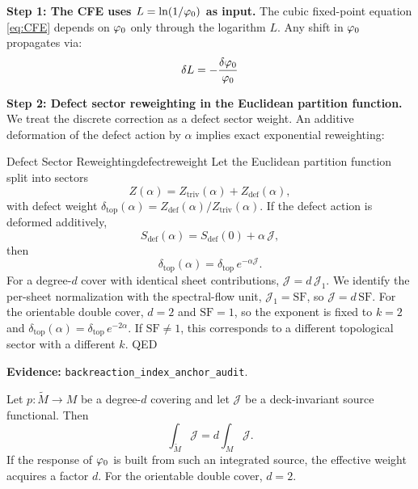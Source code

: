 \textbf{Step 1: The CFE uses $L = \ln(1/\varphi_0)$ as input.}
The cubic fixed-point equation \eqref{eq:CFE} depends on $\varphi_0$ only through 
the logarithm $L$. Any shift in $\varphi_0$ propagates via:
\begin{equation}
    \delta L = -\frac{\delta\varphi_0}{\varphi_0}
\end{equation}

\textbf{Step 2: Defect sector reweighting in the Euclidean partition function.}
We treat the discrete correction as a defect sector weight. An additive deformation of the
defect action by $\alpha$ implies exact exponential reweighting:
\begin{lemma}{Defect Sector Reweighting}{defectreweight}
Let the Euclidean partition function split into sectors
\begin{equation}
    Z(\alpha)=Z_{\mathrm{triv}}(\alpha)+Z_{\mathrm{def}}(\alpha),
\end{equation}
with defect weight $\delta_{\mathrm{top}}(\alpha)=Z_{\mathrm{def}}(\alpha)/Z_{\mathrm{triv}}(\alpha)$.
If the defect action is deformed additively,
\begin{equation}
    S_{\mathrm{def}}(\alpha)=S_{\mathrm{def}}(0)+\alpha\,\mathcal{J},
\end{equation}
then
\begin{equation}
    \delta_{\mathrm{top}}(\alpha)=\delta_{\mathrm{top}}\,e^{-\alpha\mathcal{J}}.
\end{equation}
For a degree-$d$ cover with identical sheet contributions, $\mathcal{J}=d\,\mathcal{J}_1$.
We identify the per-sheet normalization with the spectral-flow unit, $\mathcal{J}_1=\mathrm{SF}$,
so $\mathcal{J}=d\,\mathrm{SF}$. For the orientable double cover, $d=2$ and $\mathrm{SF}=1$,
so the exponent is fixed to $k=2$ and
$\delta_{\mathrm{top}}(\alpha)=\delta_{\mathrm{top}}\,e^{-2\alpha}$. If $\mathrm{SF}\neq 1$,
this corresponds to a different topological sector with a different $k$. \hfill QED
\end{lemma}
\textbf{Evidence:} \texttt{backreaction\_index\_anchor\_audit}.

\begin{tcolorbox}[colback=blue!3, colframe=blue!40, 
    title={\textbf{Lemma (Cover-Degree Scaling of Deck-Invariant Response)}}, fonttitle=\bfseries\small]
Let $p:\widetilde{M}\to M$ be a degree-$d$ covering and let $\mathcal{J}$ be a deck-invariant
source functional. Then
\begin{equation}
    \int_{\widetilde{M}}\mathcal{J} = d \int_{M}\mathcal{J}.
\end{equation}
If the response of $\varphi_0$ is built from such an integrated source, the effective
weight acquires a factor $d$. For the orientable double cover, $d=2$.
\end{tcolorbox}

